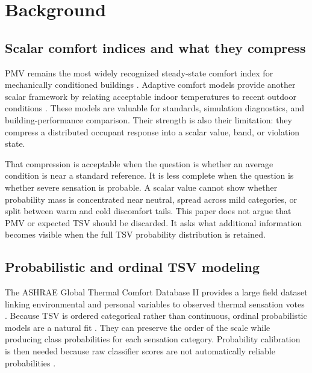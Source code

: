 \section{Background}\label{background}

\subsection{Scalar comfort indices and what they compress}

PMV remains the most widely recognized steady-state comfort index for mechanically conditioned buildings \citep{Fanger1970PMV,ISO7730_2005,ASHRAE2023}. Adaptive comfort models provide another scalar framework by relating acceptable indoor temperatures to recent outdoor conditions \citep{deDear1998Adaptive,Brager2000Adaptive,Humphreys2002Adaptive}. These models are valuable for standards, simulation diagnostics, and building-performance comparison. Their strength is also their limitation: they compress a distributed occupant response into a scalar value, band, or violation state.

That compression is acceptable when the question is whether an average condition is near a standard reference. It is less complete when the question is whether severe sensation is probable. A scalar value cannot show whether probability mass is concentrated near neutral, spread across mild categories, or split between warm and cold discomfort tails. This paper does not argue that PMV or expected TSV should be discarded. It asks what additional information becomes visible when the full TSV probability distribution is retained.

\subsection{Probabilistic and ordinal TSV modeling}

The ASHRAE Global Thermal Comfort Database II provides a large field dataset linking environmental and personal variables to observed thermal sensation votes \citep{Foldvary2018GlobalDB}. Because TSV is ordered categorical rather than continuous, ordinal probabilistic models are a natural fit \citep{McCullagh1980Ordinal,Agresti2010Ordinal,Favero2023Ordinal}. They can preserve the order of the scale while producing class probabilities for each sensation category. Probability calibration is then needed because raw classifier scores are not automatically reliable probabilities \citep{Niculescu-Mizil2005PredictingGP,Gneiting2007Scoring}.

